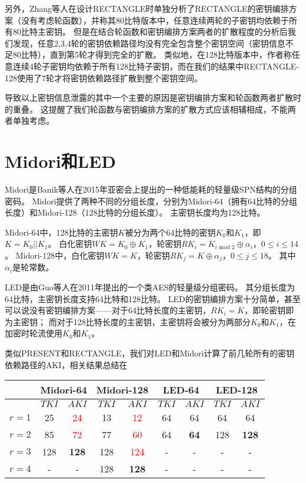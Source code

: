 另外，Zhang等人在设计RECTANGLE时单独分析了RECTANGLE的密钥编排方案（没有考虑轮函数），并称其80比特版本中，任意连续两轮的子密钥均依赖于所有80比特主密钥。
但是在结合轮函数和密钥编排方案两者的扩散程度的分析后我们发现，任意2,3,4轮的密钥依赖路径均没有完全包含整个密钥空间（密钥信息不足80比特），直到第5轮才得到完全的扩散。
类似地，在128比特版本中，作者称任意连续4轮子密钥均依赖于所有128比特子密钥，而在我们的结果中RECTANGLE-128使用了7轮才将密钥依赖路径扩散到整个密钥空间。

导致以上密钥信息泄露的其中一个主要的原因是密钥编排方案和轮函数两者扩散时的重叠。
这提醒了我们轮函数与密钥编排方案的扩散方式应该相辅相成，不能两者单独考虑。

\section{Midori和LED}
Midori是Banik等人在2015年亚密会上提出的一种低能耗的轻量级SPN结构的分组密码。
Midori提供了两种不同的分组长度，分别为Midori-64（拥有64比特的分组长度）和Midori-128（128比特的分组长度）。
主密钥长度均为128比特。

Midori-64中，128比特的主密钥$K$被分为两个64比特的密钥$K_0$和$K_1$，即$K=K_0||K_1$。
白化密钥$WK=K_0\oplus K_1$，轮密钥$RK_i=K_{i\mbox{ mod }2}\oplus\alpha_i$，$0\leq i\leq 14$。
Midori-128中，白化密钥$WK=K$，轮密钥$RK_j=K\oplus\alpha_j$，$0\leq j\leq 18$。
其中$\alpha_i$是轮常数。

LED是由Guo等人在2011年提出的一个类AES的轻量级分组密码。
其分组长度为64比特，主密钥长度支持64比特和128比特。
LED的密钥编排方案十分简单，甚至可以说没有密钥编排方案——对于64比特长度的主密钥，$RK_i=K$，即轮密钥即为主密钥；
而对于128比特长度的主密钥，主密钥将会被分为两部分$K_0$和$K_1$，在加密时轮流使用$K_0$和$K_1$。

类似PRESENT和RECTANGLE，我们对LED和Midori计算了前几轮所有的密钥依赖路径的AKI，相关结果总结在

\begin{table}[htbp]
\centering
\begin{tabular}{c|cc|cc|cc|cc}
\hline
&\multicolumn{2}{c|}{Midori-64\quad}&\multicolumn{2}{c|}{Midori-128}&\multicolumn{2}{c|}{LED-64\quad}&\multicolumn{2}{c}{LED-128}\\
\hline
&$TKI$&\quad $AKI$&$TKI$&\quad $AKI$&$TKI$&\quad $AKI$&$TKI$&\quad $AKI$\\
$r=1$&25&\textcolor{red}{24}&13&\textcolor{red}{12}&64&64&64&64\\
$r=2$&85 &\textcolor{red}{72}&77 &\textcolor{red}{60}&64& \textbf{64}  &128 &\textbf{128}\\
$r=3$&128 &\textbf{128} &128 &\textcolor{red}{124}&- &- &- &-\\
$r=4$&- &- &128 &\textbf{128}&- &- &- &-\\
\hline
\end{tabular}
\end{table}

